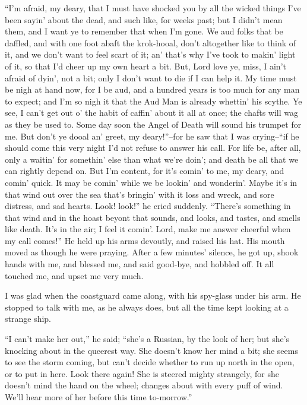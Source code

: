 \documentclass[12pt,openright]{book}
\begin{document}
“I’m afraid, my deary, that I must have shocked you by all the wicked things I’ve been sayin’ about the dead, and such like, for weeks past; but I didn’t mean them, and I want ye to remember that when I’m gone. We aud folks that be daffled, and with one foot abaft the krok-hooal, don’t altogether like to think of it, and we don’t want to feel scart of it; an’ that’s why I’ve took to makin’ light of it, so that I’d cheer up my own heart a bit. But, Lord love ye, miss, I ain’t afraid of dyin’, not a bit; only I don’t want to die if I can help it. My time must be nigh at hand now, for I be aud, and a hundred years is too much for any man to expect; and I’m so nigh it that the Aud Man is already whettin’ his scythe. Ye see, I can’t get out o’ the habit of caffin’ about it all at once; the chafts will wag as they be used to. Some day soon the Angel of Death will sound his trumpet for me. But don’t ye dooal an’ greet, my deary!”–for he saw that I was crying–“if he should come this very night I’d not refuse to answer his call. For life be, after all, only a waitin’ for somethin’ else than what we’re doin’; and death be all that we can rightly depend on. But I’m content, for it’s comin’ to me, my deary, and comin’ quick. It may be comin’ while we be lookin’ and wonderin’. Maybe it’s in that wind out over the sea that’s bringin’ with it loss and wreck, and sore distress, and sad hearts. Look! look!” he cried suddenly. “There’s something in that wind and in the hoast beyont that sounds, and looks, and tastes, and smells like death. It’s in the air; I feel it comin’. Lord, make me answer cheerful when my call comes!” He held up his arms devoutly, and raised his hat. His mouth moved as though he were praying. After a few minutes’ silence, he got up, shook hands with me, and blessed me, and said good-bye, and hobbled off. It all touched me, and upset me very much.

I was glad when the coastguard came along, with his spy-glass under his arm. He stopped to talk with me, as he always does, but all the time kept looking at a strange ship.

“I can’t make her out,” he said; “she’s a Russian, by the look of her; but she’s knocking about in the queerest way. She doesn’t know her mind a bit; she seems to see the storm coming, but can’t decide whether to run up north in the open, or to put in here. Look there again! She is steered mighty strangely, for she doesn’t mind the hand on the wheel; changes about with every puff of wind. We’ll hear more of her before this time to-morrow.”
\end{document}
